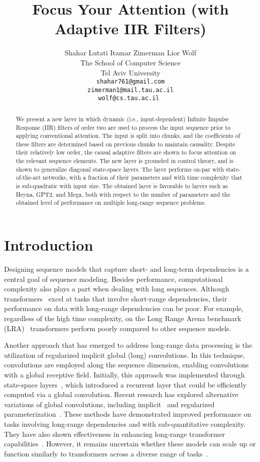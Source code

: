 \documentclass[11pt]{article}
\title{Focus Your Attention (with Adaptive IIR Filters)}
\author{Shahar Lutati \quad Itamar Zimerman \quad Lior Wolf \\
  The School of Computer Science\\
  Tel Aviv University\\
   \texttt{shahar761@gmail.com} \\  \texttt{zimerman1@mail.tau.ac.il} \\ \texttt{wolf@cs.tau.ac.il } \\
}
\begin{document}
\maketitle


\begin{abstract}
We present a new layer in which dynamic (i.e., input-dependent) Infinite Impulse Response (IIR) filters of order two are used to process the input sequence prior to applying conventional attention. The input is split into chunks, and the coefficients of these filters are determined based on previous chunks to maintain causality. Despite their relatively low order, the causal adaptive filters are shown to focus attention on the relevant sequence elements. The new layer is grounded in control theory, and is shown to generalize diagonal state-space layers. The layer performs on-par with state-of-the-art networks, with a fraction of their parameters and with time complexity that is sub-quadratic with input size. The obtained layer is favorable to layers such as Heyna, GPT2, and Mega, both with respect to the number of parameters and the obtained level of performance on multiple long-range sequence problems.
\end{abstract}

\section{Introduction}




Designing sequence models that capture short- and long-term dependencies is a central goal of sequence modeling. Besides performance, computational complexity also plays a part when dealing with long sequences. Although transformers~\cite{attention_is_all_u_need} excel at tasks that involve short-range dependencies, their performance on data with long-range dependencies can be poor. For example, regardless of the high time complexity, on the Long Range Arena benchmark (LRA)~\cite{tay2020long} transformers perform poorly compared to other sequence models.

Another approach that has emerged to address long-range data processing is the utilization of regularized implicit global (long) convolutions. In this technique, convolutions are employed along the sequence dimension, enabling convolutions with a global receptive field. Initially, this approach was implemented through state-space layers~\cite{gu2021combining,gu2021efficiently}, which introduced a recurrent layer that could be efficiently computed via a global convolution. Recent research has explored alternative variations of global convolutions, including implicit~\cite{poli2023hyena} and regularized parameterization~\cite{fu2023simple,li2022makes}. These methods have demonstrated improved performance on tasks involving long-range dependencies and with sub-quantitative complexity. They have also shown effectiveness in enhancing long-range transformer capabilities~\cite{ma2022mega,zuo2022efficient,saon2023diagonal}. However, it remains uncertain whether these models can scale up or function similarly to transformers across a diverse range of tasks~\cite{Vardasbi2023StateSA}.
\end{document}
